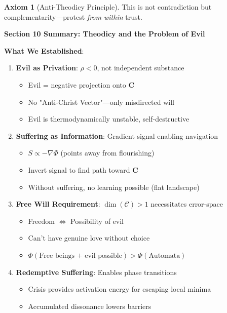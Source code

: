 \documentclass[11pt,a4paper]{article}
\theoremstyle{definition}
\newtheorem{axiom}{Axiom}[section]
\theoremstyle{remark}
\newcommand{\CC}{\mathcal{C}}
\begin{document}
\begin{enumerate}
\begin{axiom}[Anti-Theodicy Principle]
This is not contradiction but complementarity—protest \textit{from within} trust.
\end{axiom}

\begin{mdframed}[backgroundcolor=green!10,linewidth=2pt,linecolor=green!70!black]
\textbf{Section 10 Summary: Theodicy and the Problem of Evil}

\textbf{What We Established}:
\begin{enumerate}[nosep]
    \item \textbf{Evil as Privation}: \(\rho < 0\), not independent substance
        \begin{itemize}[nosep]
            \item Evil = negative projection onto \(\mathbf{C}\)
            \item No "Anti-Christ Vector"—only misdirected will
            \item Evil is thermodynamically unstable, self-destructive
        \end{itemize}
    \item \textbf{Suffering as Information}: Gradient signal enabling navigation
        \begin{itemize}[nosep]
            \item \(S \propto -\nabla \Phi\) (points away from flourishing)
            \item Invert signal to find path toward \(\mathbf{C}\)
            \item Without suffering, no learning possible (flat landscape)
        \end{itemize}
    \item \textbf{Free Will Requirement}: \(\dim(\CC) > 1\) necessitates error-space
        \begin{itemize}[nosep]
            \item Freedom \(\iff\) Possibility of evil
            \item Can't have genuine love without choice
            \item \(\Phi(\text{Free beings + evil possible}) > \Phi(\text{Automata})\)
        \end{itemize}
    \item \textbf{Redemptive Suffering}: Enables phase transitions
        \begin{itemize}[nosep]
            \item Crisis provides activation energy for escaping local minima
            \item Accumulated dissonance lowers barriers

\end{itemize}
\end{enumerate}
\end{mdframed}
\end{enumerate}
\end{document}

